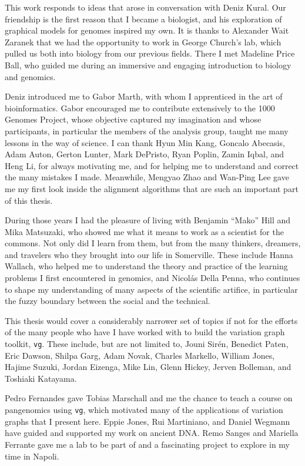 \documentclass[a4paper,12pt,numbered,oneside]{Classes/PhDThesisPSnPDF}
\begin{document}
\begin{acknowledgements}

  This work responds to ideas that arose in conversation with Deniz Kural.
  Our friendship is the first reason that I became a biologist, and his exploration of graphical models for genomes inspired my own.
  It is thanks to Alexander Wait Zaranek that we had the opportunity to work in George Church's lab, which pulled us both into biology from our previous fields.
  There I met Madeline Price Ball, who guided me during an immersive and engaging introduction to biology and genomics.

  Deniz introduced me to Gabor Marth, with whom I apprenticed in the art of bioinformatics.
  Gabor encouraged me to contribute extensively to the 1000 Genomes Project, whose objective captured my imagination and whose participants, in particular the members of the analysis group, taught me many lessons in the way of science.
  I can thank Hyun Min Kang, Goncalo Abecasis, Adam Auton, Gerton Lunter, Mark DePristo, Ryan Poplin, Zamin Iqbal, and Heng Li, for always motivating me, and for helping me to understand and correct the many mistakes I made.
  Meanwhile, Mengyao Zhao and Wan-Ping Lee gave me my first look inside the alignment algorithms that are such an important part of this thesis.

  During those years I had the pleasure of living with Benjamin ``Mako'' Hill and Mika Matsuzaki, who showed me what it means to work as a scientist for the commons.
  Not only did I learn from them, but from the many thinkers, dreamers, and travelers who they brought into our life in Somerville.
  These include Hanna Wallach, who helped me to understand the theory and practice of the learning problems I first encountered in genomics, and Nicol\'{a}s Della Penna, who continues to shape my understanding of many aspects of the scientific artifice, in particular the fuzzy boundary between the social and the technical.

  This thesis would cover a considerably narrower set of topics if not for the efforts of the many people who have I have worked with to build the variation graph toolkit, {\tt vg}.
  These include, but are not limited to,
  Jouni Sir\'{e}n,
  Benedict Paten,
  Eric Dawson,
  Shilpa Garg,
  Adam Novak,
  Charles Markello,
  William Jones,
  Hajime Suzuki,
  Jordan Eizenga,
  Mike Lin,
  Glenn Hickey,
  Jerven Bolleman,
  and Toshiaki Katayama.

  Pedro Fernandes gave Tobias Marschall and me the chance to teach a course on pangenomics using {\tt vg}, which motivated many of the applications of variation graphs that I present here.
  Eppie Jones, Rui Martiniano, and Daniel Wegmann have guided and supported my work on ancient DNA.
  Remo Sanges and Mariella Ferrante gave me a lab to be part of and a fascinating project to explore in my time in Napoli.


\end{acknowledgements}
\end{document}
